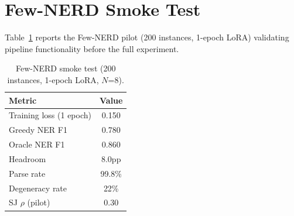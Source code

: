 \documentclass[11pt]{article}
\begin{document}



\appendix

\section{Few-NERD Smoke Test}
\label{app:smoke}

Table~\ref{tab:smoke} reports the Few-NERD pilot (200 instances, 1-epoch LoRA) validating pipeline functionality before the full experiment.

\begin{table}[h]
\centering
\small
\caption{Few-NERD smoke test (200 instances, 1-epoch LoRA, $N$=8).}
\label{tab:smoke}
\begin{tabular}{lc}
\toprule
Metric & Value \\
\midrule
Training loss (1 epoch) & 0.150 \\
Greedy NER F1 & 0.780 \\
Oracle NER F1 & 0.860 \\
Headroom & 8.0pp \\
Parse rate & 99.8\% \\
Degeneracy rate & 22\% \\
SJ $\rho$ (pilot) & 0.30 \\
\bottomrule
\end{tabular}
\end{table}
\end{document}
